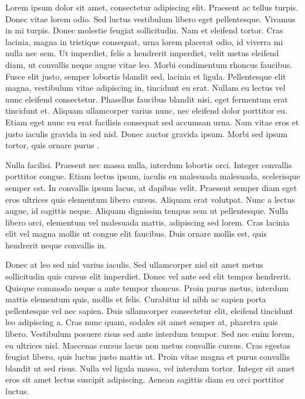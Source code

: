 \documentclass[bsc, classic, a4paper]{ufbathesis}
\begin{document}


Lorem ipsum dolor sit amet, consectetur adipiscing elit. Praesent ac tellus turpis. Donec vitae lorem odio. Sed luctus vestibulum libero eget pellentesque. Vivamus in mi turpis. Donec molestie feugiat sollicitudin. Nam et eleifend tortor. Cras lacinia, magna in tristique consequat, urna lorem placerat odio, id viverra mi nulla nec sem. Ut imperdiet, felis a hendrerit imperdiet, velit metus eleifend diam, ut convallis neque augue vitae leo. Morbi condimentum rhoncus faucibus. Fusce elit justo, semper lobortis blandit sed, lacinia et ligula. Pellentesque elit magna, vestibulum vitae adipiscing in, tincidunt eu erat. Nullam eu lectus vel nunc eleifend consectetur. Phasellus faucibus blandit nisi, eget fermentum erat tincidunt et. Aliquam ullamcorper varius nunc, nec eleifend dolor porttitor eu. Etiam eget nunc eu erat facilisis consequat sed accumsan urna. Nam vitae eros et justo iaculis gravida in sed nisl. Donec auctor gravida ipsum. Morbi sed ipsum tortor, quis ornare purus \cite{demeyer2008}.

Nulla facilisi. Praesent nec massa nulla, interdum lobortis orci. Integer convallis porttitor congue. Etiam lectus ipsum, iaculis eu malesuada malesuada, scelerisque semper est. In convallis ipsum lacus, at dapibus velit. Praesent semper diam eget eros ultrices quis elementum libero cursus. Aliquam erat volutpat. Nunc a lectus augue, id sagittis neque. Aliquam dignissim tempus sem ut pellentesque. Nulla libero orci, elementum vel malesuada mattis, adipiscing sed lorem. Cras lacinia elit vel magna mollis ut congue elit faucibus. Duis ornare mollis est, quis hendrerit neque convallis in.

Donec at leo sed nisl varius iaculis. Sed ullamcorper nisl sit amet metus sollicitudin quis cursus elit imperdiet. Donec vel ante sed elit tempor hendrerit. Quisque commodo neque a ante tempor rhoncus. Proin purus metus, interdum mattis elementum quis, mollis et felis. Curabitur id nibh ac sapien porta pellentesque vel nec sapien. Duis ullamcorper consectetur elit, eleifend tincidunt leo adipiscing a. Cras nunc quam, sodales sit amet semper at, pharetra quis libero. Vestibulum posuere risus sed ante interdum tempor. Sed nec enim lorem, eu ultrices nisl. Maecenas cursus lacus non metus convallis cursus. Cras egestas feugiat libero, quis luctus justo mattis ut. Proin vitae magna et purus convallis blandit ut sed risus. Nulla vel ligula massa, vel interdum tortor. Integer sit amet eros sit amet lectus suscipit adipiscing. Aenean sagittis diam eu orci porttitor luctus.
\end{document}
